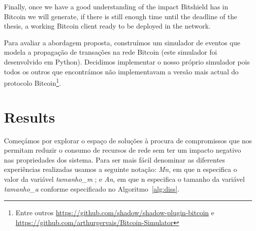 Finally, once we have a good understanding of the impact Bitshield has in Bitcoin we will generate, if there is still enough time until the deadline of the thesis, a working Bitcoin client ready to be deployed in the network.

Para avaliar a abordagem proposta, construímos um simulador de eventos que modela a propagação de transações na rede Bitcoin (este simulador foi desenvolvido em Python). Decidimos implementar o nosso próprio simulador pois todos os outros que encontrámos não implementavam a versão mais actual do protocolo Bitcoin\footnote{Entre outros \url{https://github.com/shadow/shadow-plugin-bitcoin} e\\ \url{https://github.com/arthurgervais/Bitcoin-Simulator}}.


\section{Results}
Começámos por explorar o espaço de soluções à procura de compromissos que nos permitam reduzir o consumo de recursos de rede sem ter um impacto negativo nas propriedades dos sistema.
Para ser mais fácil denominar as diferentes experiências realizadas usamos a seguinte notação: \textsl{Mn}, em que n especifica o valor da variável \textsl{tamanho\_m} ; e \textsl{An}, em que n especifica o tamanho da variável \textsl{tamanho\_a} conforme especificado no Algoritmo~\ref{alg:diss}.



